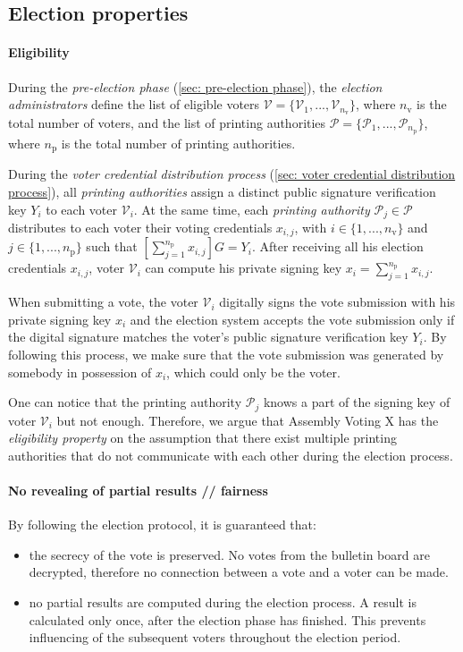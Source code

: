 \subsection{Election properties} \label{sec: election properties}
\paragraph{Eligibility}
During the \textit{pre-election phase} (\cref{sec: pre-election phase}), the \textit{election administrators} define the list of eligible voters \( \boldsymbol{\mathcal{V}} = \{\mathcal{V}_1, ..., \mathcal{V}_{n_\mathrm{v}}\} \), where $n_\mathrm{v}$ is the total number of voters, and the list of printing authorities \( \boldsymbol{\mathcal{P}} = \{\mathcal{P}_1, ..., \mathcal{P}_{n_\mathrm{p}}\} \), where $n_\mathrm{p}$ is the total number of printing authorities.

During the \textit{voter credential distribution process} (\cref{sec: voter credential distribution process}), all \textit{printing authorities} assign a distinct public signature verification key $Y_i$ to each voter $\mathcal{V}_i$. At the same time, each \textit{printing authority} \( \mathcal{P}_j \in \boldsymbol{\mathcal{P}} \) distributes to each voter their voting credentials $x_{i,j}$, with \( i \in \{ 1, ..., n_\mathrm{v} \} \) and \( j \in \{ 1, ..., n_\mathrm{p} \} \) such that \( [\sum_{j=1}^{n_\mathrm{p}} x_{i,j}]G = Y_i \). After receiving all his election credentials $x_{i,j}$, voter $\mathcal{V}_i$ can compute his private signing key \( x_i = \sum_{j=1}^{n_\mathrm{p}} x_{i,j} \).

When submitting a vote, the voter $\mathcal{V}_i$ digitally signs the vote submission with his private signing key $x_i$ and the election system accepts the vote submission only if the digital signature matches the voter's public signature verification key $Y_i$. By following this process, we make sure that the vote submission was generated by somebody in possession of $x_i$, which could only be the voter.

One can notice that the printing authority $\mathcal{P}_j$ knows a part of the signing key of voter $\mathcal{V}_i$ but not enough. Therefore, we argue that Assembly Voting X has the \textit{eligibility property} on the assumption that there exist multiple printing authorities that do not communicate with each other during the election process.

\paragraph{No revealing of partial results // fairness}
By following the election protocol, it is guaranteed that:
\begin{itemize}
    \item the secrecy of the vote is preserved. No votes from the bulletin board are decrypted, therefore no connection between a vote and a voter can be made.
    \item no partial results are computed during the election process. A result is calculated only once, after the election phase has finished. This prevents influencing of the subsequent voters throughout the election period.
\end{itemize}

